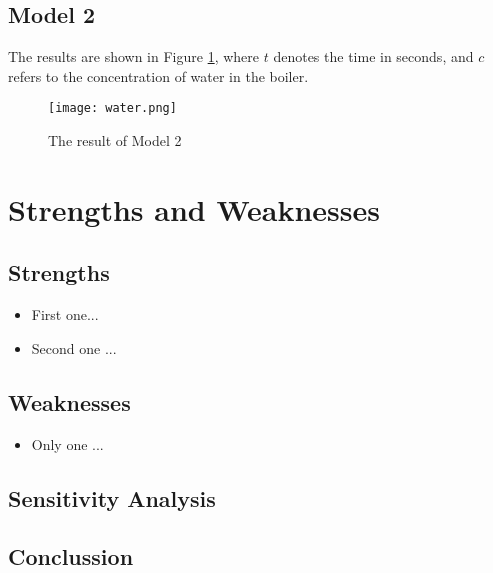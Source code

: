 \documentclass[12pt]{article}  %
\begin{document}
\subsection{Model 2}
The results are shown in Figure \ref{fig:result}, where $t$ denotes the time in seconds, and $c$ refers to the concentration of water in the boiler.

\begin{figure}[htbp]
\centering
\texttt{[image: water.png]}
\caption{The result of Model 2}\label{fig:result}
\end{figure}

\section{Strengths and Weaknesses}
\subsection{Strengths}
\begin{itemize}
    \item First one...
    \item Second one ...
\end{itemize}

\subsection{Weaknesses}
\begin{itemize}
    \item Only one ...
 \end{itemize}

\subsection{Sensitivity Analysis}

\subsection{Conclussion}
\end{document}
